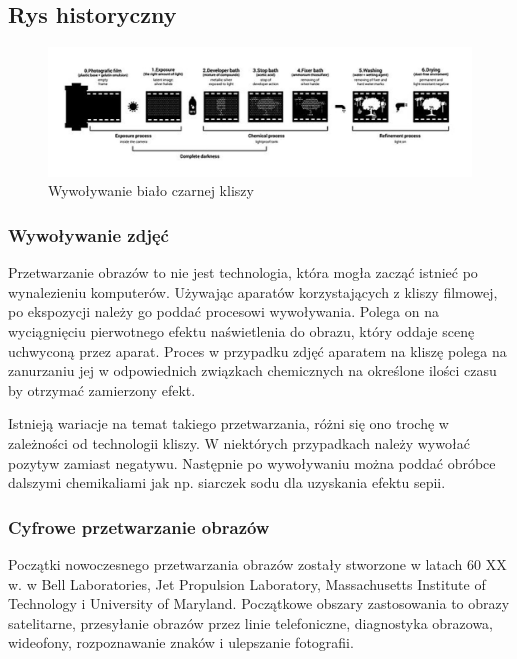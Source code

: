 \subsection{Rys historyczny}
\begin{figure}
    \includegraphics{./images/Picture1.jpg}
    \caption{Wywoływanie biało czarnej kliszy}
    \label{fig:wywolywanie}
\end{figure}
\subsubsection{Wywoływanie zdjęć}
Przetwarzanie obrazów to nie jest technologia, która mogła zacząć istnieć po wynalezieniu komputerów. Używając aparatów korzystających z kliszy filmowej, po ekspozycji należy go poddać procesowi wywoływania. Polega on na wyciągnięciu pierwotnego efektu naświetlenia do obrazu, który oddaje scenę uchwyconą przez aparat. \cite{doi:https://doi.org/10.1002/14356007.a20_001} Proces w przypadku zdjęć aparatem na kliszę polega na zanurzaniu jej w odpowiednich związkach chemicznych na określone ilości czasu by otrzymać zamierzony efekt. 

Istnieją wariacje na temat takiego przetwarzania, różni się ono trochę w zależności od technologii kliszy. W niektórych przypadkach należy wywołać pozytyw zamiast negatywu. \cite{almanac} Następnie po wywoływaniu można poddać obróbce dalszymi chemikaliami jak np. siarczek sodu dla uzyskania efektu sepii. \cite{sepia} 

\subsubsection{Cyfrowe przetwarzanie obrazów}
Początki nowoczesnego przetwarzania obrazów zostały stworzone w latach 60 XX w. w Bell Laboratories, Jet Propulsion Laboratory, Massachusetts Institute of Technology i University of Maryland. \cite{computerProcessing} Początkowe obszary zastosowania to obrazy satelitarne, przesyłanie obrazów przez linie telefoniczne, diagnostyka obrazowa, wideofony, rozpoznawanie znaków i ulepszanie fotografii. 

